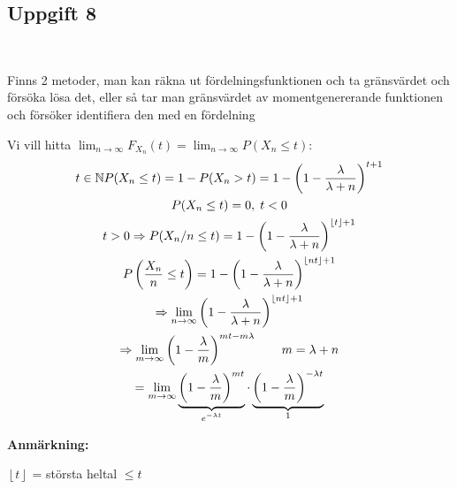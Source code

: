 \subsection{Uppgift 8}\hfill\\\par
\noindent Finns 2 metoder, man kan räkna ut fördelningsfunktionen och ta gränsvärdet och försöka lösa det, eller så tar man gränsvärdet av momentgenererande funktionen och försöker identifiera den med en fördelning\par
\noindent Vi vill hitta $\lim_{n\to\infty}F_{X_n}(t) = \lim_{n\to\infty}P(X_n\leq t)$:
\begin{equation*}
  \begin{gathered}
    t\in\mathbb{N}
    P(X_n\leq t) = 1-P(X_n> t) = 1-\left(1-\dfrac{\lambda}{\lambda+n}\right)^{t+1}\\
    P(X_n\leq t) = 0,\; t<0\\
    t>0\Rightarrow P(X_n/n\leq t) = 1-\left(1-\dfrac{\lambda}{\lambda+n}\right)^{\left\lfloor t\right\rfloor+1}\\
    P\left(\dfrac{X_n}{n}\leq t\right) = 1-\left(1-\dfrac{\lambda}{\lambda+n}\right)^{\left\lfloor nt\right\rfloor+1}\\
    \Rightarrow\lim_{n\to\infty}\left(1-\dfrac{\lambda}{\lambda+n}\right)^{\left\lfloor nt\right\rfloor+1}\\
    \Rightarrow\lim_{m\to\infty}\left(1-\dfrac{\lambda}{m}\right)^{mt-m\lambda}\qquad m = \lambda+n\\
    = \lim_{m\to\infty}\underbrace{\left(1-\dfrac{\lambda}{m}\right)^{mt}}_{\text{$e^{-\lambda t}$}}\cdot\underbrace{\left(1-\dfrac{\lambda}{m}\right)^{-\lambda t}}_{\text{1}}
  \end{gathered}
\end{equation*}
\par\bigskip
\noindent\textbf{Anmärkning:}\par
\noindent $\left\lfloor t\right\rfloor$ = största heltal $\leq t$
